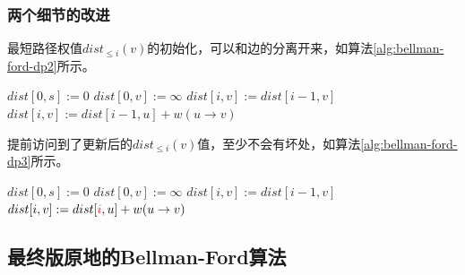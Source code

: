 \subsubsection{两个细节的改进}

最短路径权值$dist_{\leq i}(v)$的初始化，可以和边的分离开来，如算法\ref{alg:bellman-ford-dp2}所示。

\begin{algorithm}[htbp]
    \caption{($s$)}
    \label{alg:bellman-ford-dp2}
    \begin{algorithmic}[1]
        \State $dist[0, s] := 0$
        \State $dist[0, v] := \infty$
        \EndFor
                \State $dist[i,v] := dist[i-1, v]$
            \EndFor        
                    \State $dist[i,v] := dist[i-1, u] + w(u\rightarrow v)$
                \EndIf
            \EndFor
        \EndFor
    \end{algorithmic}
\end{algorithm}

提前访问到了更新后的$dist_{\leq i}(v)$值，至少不会有坏处，如算法\ref{alg:bellman-ford-dp3}所示。
\begin{algorithm}[htbp]
    \caption{($s$)}
    \label{alg:bellman-ford-dp3}
    \begin{algorithmic}[1]
        \State $dist[0, s] := 0$
            \State $dist[0, v] := \infty$
        \EndFor
                \State $dist[i,v] := dist[i-1, v]$
            \EndFor        
                    \State $dist[i,v] := dist[\textcolor{red}{i}, u] + w(u\rightarrow v)$ 
                \EndIf
            \EndFor
        \EndFor
    \end{algorithmic}
\end{algorithm}

\subsection{最终版原地的Bellman-Ford算法}

